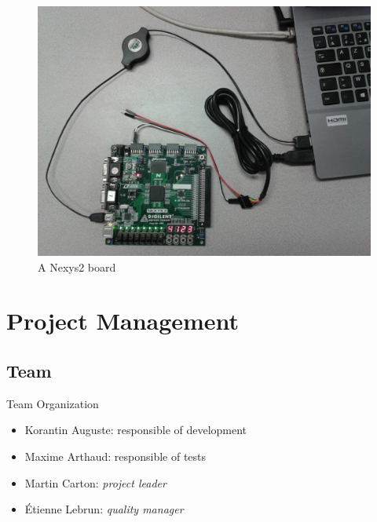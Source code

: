 \documentclass{beamer}
\begin{document}
    \begin{frame}[plain]
      \begin{figure}
        \centering
        \includegraphics[width=\textwidth, keepaspectratio]{fig/Nexys2.jpg}
        \caption{A Nexys2 board}
      \end{figure}
    \end{frame}

  \section{Project Management}
    \subsection{Team}
      \begin{frame}{Team Organization}
        \begin{itemize}
          \item Korantin Auguste: responsible of development
          \item Maxime Arthaud: responsible of tests
          \item Martin Carton: \textit{project leader}
          \item Étienne Lebrun: \textit{quality manager}
        \end{itemize}
      \end{frame}
\end{document}
